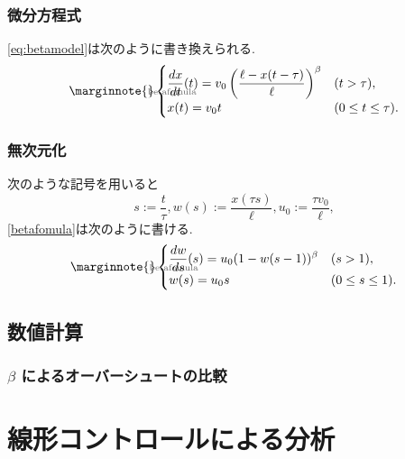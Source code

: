 \documentclass[leqno,11pt]{jarticle}
\makeatletter
\let\temp@label\label
\def\label#1{\marginnote{\hbox to 0pt{\scriptsize \textcolor{black!60}{#1}\hss}}\temp@label{#1}\ignorespaces}
\numberwithin{equation}{section}
\theoremstyle{definition} %
\theoremstyle{definition} %
\makeatother
\begin{document}
\subsubsection{微分方程式}
\eqref{eq:betamodel}は次のように書き換えられる.
\begin{equation}\label{betafomula}\begin{cases}
    \displaystyle\frac{dx}{dt}(t)=v_0\left(\frac{\ell-x(t-\tau)}{\ell}\right)^\beta &(t>\tau),\\
    x(t)=v_0 t &(0\le t \le \tau).
\end{cases}\end{equation}
\subsubsection{無次元化}
次のような記号を用いると
\begin{equation}
    s:=\frac{t}{\tau},w(s):=\frac{x(\tau s)}{\ell},u_0:=\frac{\tau v_0}{\ell},
\end{equation}
\eqref{betafomula}は次のように書ける.
\begin{equation}\label{betafomula}\begin{cases}
    \displaystyle\frac{dw}{ds}(s)=u_0(1-w(s-1))^\beta &(s>1),\\
    w(s)=u_0 s &(0\le s \le 1).
\end{cases}\end{equation}
\subsection{数値計算}
\subsubsection{$\beta$ によるオーバーシュートの比較}

\section{線形コントロールによる分析}
\end{document}
